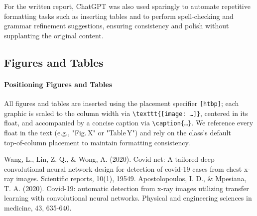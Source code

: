 \documentclass[conference]{IEEEtran}
\begin{document}
For the written report, ChatGPT was also used sparingly to automate repetitive formatting tasks such as inserting tables and to perform spell‑checking and grammar refinement suggestions, ensuring consistency and polish without supplanting the original content.

\subsection{Figures and Tables}

\paragraph{Positioning Figures and Tables}

All figures and tables are inserted using the placement specifier \verb|[htbp]|; each graphic is scaled to the column width via
\verb|\texttt{[image: …]}|, centered in its float, and accompanied by a concise caption via \verb|\caption{…}|. We reference every float in the text (e.g., "Fig. X" or "Table Y") and rely on the class’s default top‑of‑column placement to maintain formatting consistency.

\begin{thebibliography}{00}

	 Wang, L., Lin, Z. Q., \& Wong, A. (2020). Covid-net: A tailored deep convolutional neural network design for detection of covid-19 cases from chest x-ray images. Scientific reports, 10(1), 19549.
	 Apostolopoulos, I. D., \& Mpesiana, T. A. (2020). Covid-19: automatic detection from x-ray images utilizing transfer learning with convolutional neural networks. Physical and engineering sciences in medicine, 43, 635-640.
\end{thebibliography}
\end{document}
